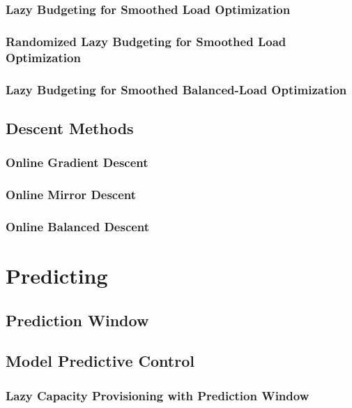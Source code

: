 \subsubsection{Lazy Budgeting for Smoothed Load Optimization}

\subsubsection{Randomized Lazy Budgeting for Smoothed Load Optimization}

\subsubsection{Lazy Budgeting for Smoothed Balanced-Load Optimization}

\subsection{Descent Methods}

\subsubsection{Online Gradient Descent}

\subsubsection{Online Mirror Descent}

\subsubsection{Online Balanced Descent}

\section{Predicting}

\subsection{Prediction Window}

\subsection{Model Predictive Control}

\subsubsection{Lazy Capacity Provisioning with Prediction Window}
